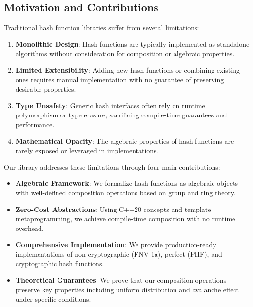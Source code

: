 \documentclass[11pt,a4paper]{article}
\theoremstyle{definition}
\begin{document}
\subsection{Motivation and Contributions}

Traditional hash function libraries suffer from several limitations:

\begin{enumerate}
    \item \textbf{Monolithic Design}: Hash functions are typically implemented as standalone algorithms without consideration for composition or algebraic properties.

    \item \textbf{Limited Extensibility}: Adding new hash functions or combining existing ones requires manual implementation with no guarantee of preserving desirable properties.

    \item \textbf{Type Unsafety}: Generic hash interfaces often rely on runtime polymorphism or type erasure, sacrificing compile-time guarantees and performance.

    \item \textbf{Mathematical Opacity}: The algebraic properties of hash functions are rarely exposed or leveraged in implementations.
\end{enumerate}

Our library addresses these limitations through four main contributions:

\begin{itemize}
    \item \textbf{Algebraic Framework}: We formalize hash functions as algebraic objects with well-defined composition operations based on group and ring theory.

    \item \textbf{Zero-Cost Abstractions}: Using C++20 concepts and template metaprogramming, we achieve compile-time composition with no runtime overhead.

    \item \textbf{Comprehensive Implementation}: We provide production-ready implementations of non-cryptographic (FNV-1a), perfect (PHF), and cryptographic hash functions.

    \item \textbf{Theoretical Guarantees}: We prove that our composition operations preserve key properties including uniform distribution and avalanche effect under specific conditions.
\end{itemize}
\end{document}

